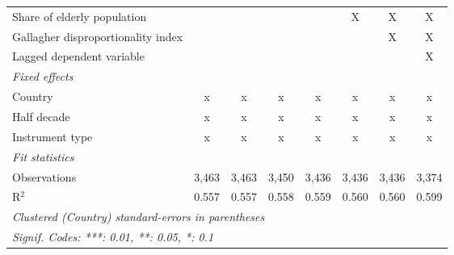 \begin{tabular}{lccccccc}
   Share of elderly population                                      &                &                &                &                & X              & X              & X\\  
   Gallagher disproportionality index                               &                &                &                &                &                & X              & X\\  
   Lagged dependent variable                                        &                &                &                &                &                &                & X\\  
   \emph{Fixed effects}\\
   Country                                                          & x              & x              & x              & x              & x              & x              & x\\  
   Half decade                                                      & x              & x              & x              & x              & x              & x              & x\\  
   Instrument type                                                  & x              & x              & x              & x              & x              & x              & x\\  
   \midrule \emph{Fit statistics}\\
   Observations                                                     & 3,463          & 3,463          & 3,450          & 3,436          & 3,436          & 3,436          & 3,374\\  
   R$^2$                                                            & 0.557          & 0.557          & 0.558          & 0.559          & 0.560          & 0.560          & 0.599\\  
   \midrule
   \multicolumn{8}{l}{\emph{Clustered (Country) standard-errors in parentheses}}\\
   \multicolumn{8}{l}{\emph{Signif. Codes: ***: 0.01, **: 0.05, *: 0.1}}\\
\end{tabular}
\par\endgroup


